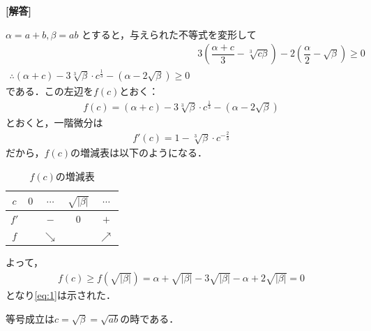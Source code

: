 \documentclass[../../main.tex]{subfiles}
\begin{document}
\begin{oframed}
  
\end{oframed}

{\bf [解答]}

$\alpha = a+b, \beta = ab$ とすると，与えられた不等式を変形して
\begin{align}
  & 3 \left( \dfrac{\alpha+c}{3}-\sqrt[3]{c\beta} \right) - 2 \left( \dfrac{\alpha}{2}-\sqrt{\beta} \right) \ge 0 \\
  \therefore
  (\alpha+c) - 3\sqrt[3]{\beta} \cdot c^{\frac{1}{3}} - (\alpha - 2\sqrt{\beta}) \ge 0 \label{eq:1}
\end{align}
である．この左辺を$f(c)$とおく：
\begin{align}
  f(c) =  (\alpha+c) - 3\sqrt[3]{\beta} \cdot c^{\frac{1}{3}} - (\alpha - 2\sqrt{\beta})
\end{align}
とおくと，一階微分は
\begin{align}
  f'(c) = 1 - \sqrt[3]{\beta} \cdot c^{-\frac{2}{3}}
\end{align}
だから，$f(c)$の増減表は以下のようになる．

\begin{table}[htb]
  \centering
  \caption{$f(c)$の増減表}
  \begin{tabular}{|c|c|c|c|c|}
    \hline
    $c$ & $0$ & $\cdots$ & $\sqrt{|\beta|}$ & $\cdots$ \\
    \hline
    $f'$ & & $-$ & $0$ & $+$ \\
    \hline
    $f$ & & $\searrow$ & & $\nearrow$ \\
    \hline
  \end{tabular}
\end{table}

よって，
\begin{align}
  f(c) \ge f(\sqrt{|\beta|}) = \alpha + \sqrt{|\beta|} - 3\sqrt{|\beta|} - \alpha + 2\sqrt{|\beta|} = 0
\end{align}
となり\cref{eq:1}は示された．

等号成立は$c=\sqrt{\beta}=\sqrt{ab}$の時である．
\end{document}
